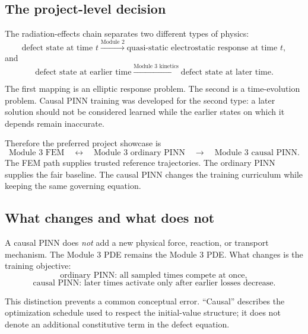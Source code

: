 \documentclass[11pt]{article}
\begin{document}
\subsection{The project-level decision}

The radiation-effects chain separates two different types of physics:
\begin{equation}
\text{defect state at time }t
\xrightarrow{\text{Module 2}}
\text{quasi-static electrostatic response at time }t,
\end{equation}
and
\begin{equation}
\text{defect state at earlier time}
\xrightarrow{\text{Module 3 kinetics}}
\text{defect state at later time}.
\end{equation}

The first mapping is an elliptic response problem. The second is a time-evolution problem. Causal PINN training was developed for the second type: a later solution should not be considered learned while the earlier states on which it depends remain inaccurate.

Therefore the preferred project showcase is
\begin{equation}
\boxed{
\text{Module 3 FEM}
\quad\longleftrightarrow\quad
\text{Module 3 ordinary PINN}
\quad\longrightarrow\quad
\text{Module 3 causal PINN}.
}
\end{equation}
The FEM path supplies trusted reference trajectories. The ordinary PINN supplies the fair baseline. The causal PINN changes the training curriculum while keeping the same governing equation.

\subsection{What changes and what does not}

A causal PINN does \emph{not} add a new physical force, reaction, or transport mechanism. The Module 3 PDE remains the Module 3 PDE. What changes is the training objective:
\begin{equation}
\text{ordinary PINN: all sampled times compete at once},
\end{equation}
\begin{equation}
\text{causal PINN: later times activate only after earlier losses decrease}.
\end{equation}

This distinction prevents a common conceptual error. ``Causal'' describes the optimization schedule used to respect the initial-value structure; it does not denote an additional constitutive term in the defect equation.
\end{document}
